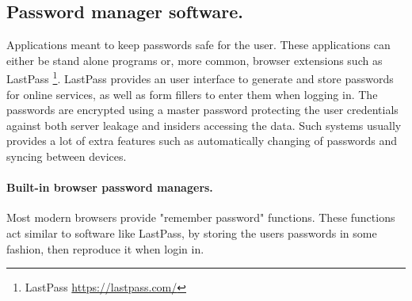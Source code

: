 \subsection{Password manager software.} \label{subsec:pms}Applications meant to keep passwords safe for the user. These applications can either be stand alone programs or, more common, browser extensions such as LastPass \footnote{LastPass \url{https://lastpass.com/}}. LastPass provides an user interface to generate and store passwords for online services, as well as form fillers to enter them when logging in. The passwords are encrypted using a master password protecting the user credentials against both server leakage and insiders accessing the data. Such systems usually provides a lot of extra features such as automatically changing of passwords and syncing between devices. 

\paragraph{Built-in browser password managers.} Most modern browsers provide "remember password" functions. These functions act similar to software like LastPass, by storing the users passwords in some fashion, then reproduce it when login in. 

